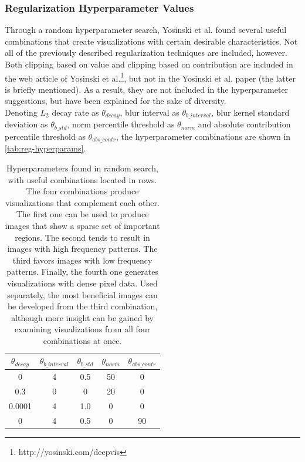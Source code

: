 \subsubsection{Regularization Hyperparameter Values}

Through a random hyperparameter search, Yosinski et al. \cite{yosinski-deepvis} found several useful combinations that create visualizations with certain desirable characteristics. Not all of the previously described regularization techniques are included, however. Both clipping based on value and clipping based on contribution are included in the web article of Yosinski et al.\footnote{http://yosinski.com/deepvis}, but not in the Yosinski et al. paper \cite{yosinski-deepvis} (the latter is briefly mentioned). As a result, they are not included in the hyperparameter suggestions, but have been explained for the sake of diversity. \\

\noindent Denoting $L_2$ decay rate as $\theta_{decay}$, blur interval as $\theta_{b\_interval}$, blur kernel standard deviation as $\theta_{b\_std}$, norm percentile threshold as $\theta_{norm}$ and absolute contribution percentile threshold as $\theta_{abs\_contr}$, the hyperparameter combinations are shown in \autoref{tab:reg-hyperparams}.

\begin{table}[!h]
\begin{center}
\begin{tabular}{|c|c|c|c|c|}
\hline
\textbf{$\theta_{decay}$} & \textbf{$\theta_{b\_interval}$} & \textbf{$\theta_{b\_std}$} & \textbf{$\theta_{norm}$} & \textbf{$\theta_{abs\_contr}$} \\ \hline
0 & 4 & 0.5 & 50 & 0 \\ \hline
0.3 & 0 & 0 & 20 & 0 \\ \hline
0.0001 & 4 & 1.0 & 0 & 0 \\ \hline
0 & 4 & 0.5 & 0 & 90 \\ \hline
\end{tabular}
\end{center}
\caption[Hyperparameters found in random search.]{Hyperparameters found in random search, with useful combinations located in rows. The four combinations produce visualizations that complement each other. The first one can be used to produce images that show a sparse set of important regions. The second tends to result in images with high frequency patterns. The third favors images with low frequency patterns. Finally, the fourth one generates visualizations with dense pixel data. Used separately, the most beneficial images can be developed from the third combination, although more insight can be gained by examining visualizations from all four combinations at once.}
\label{tab:reg-hyperparams}
\end{table}

